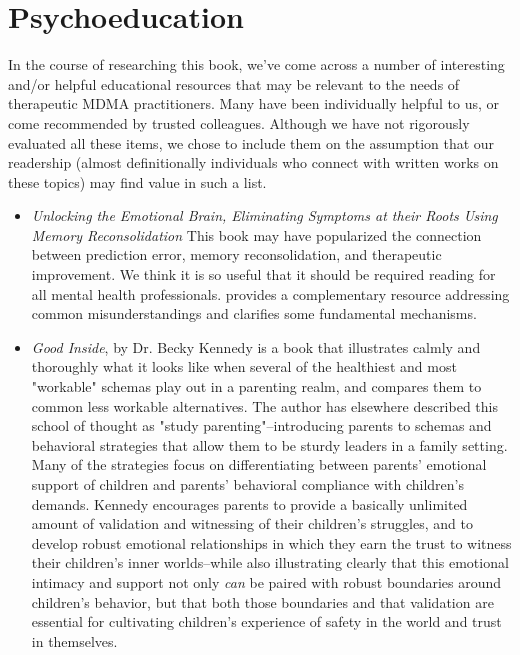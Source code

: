 \documentclass[12pt,letterpaper]{book}
\begin{document}
\section{Psychoeducation}
\label{sec:psychoeducation}
In the course of researching this book, we've come across a number of interesting and/or helpful educational resources that may be relevant to the needs of therapeutic MDMA practitioners. Many have been individually helpful to us, or come recommended by trusted colleagues. Although we have not rigorously evaluated all these items, we chose to include them on the assumption that our readership (almost definitionally individuals who connect with written works on these topics) may find value in such a list.
\begin{itemize}
    \item \textit{Unlocking the Emotional Brain, Eliminating Symptoms at their Roots Using Memory Reconsolidation} This book may have popularized the connection between prediction error, memory reconsolidation, and therapeutic improvement. We think it is so useful that it should be required reading for all mental health professionals. \textcite{ecker2015misunderstood} provides a complementary resource addressing common misunderstandings and clarifies some fundamental mechanisms.
    \item \textit{Good Inside}, by Dr. Becky Kennedy \cite{kennedy2022good} is a book that illustrates calmly and thoroughly what it looks like when several of the healthiest and most "workable" schemas play out in a parenting realm, and compares them to common less workable alternatives. The author has elsewhere described this school of thought as "study parenting"–introducing parents to schemas and behavioral strategies that allow them to be sturdy leaders in a family setting. Many of the strategies focus on differentiating between parents' emotional support of children and parents' behavioral compliance with children's demands. Kennedy encourages parents to provide a basically unlimited amount of validation and witnessing of their children's struggles, and to develop robust emotional relationships in which they earn the trust to witness their children's inner worlds–while also illustrating clearly that this emotional intimacy and support not only \textit{can} be paired with robust boundaries around children's behavior, but that both those boundaries and that validation are essential for cultivating children's experience of safety in the world and trust in themselves. 


\end{itemize}
\end{document}
